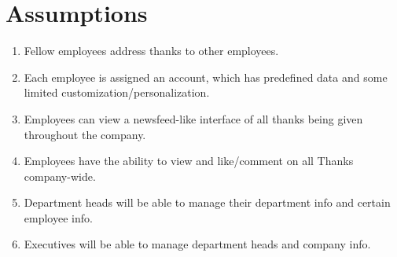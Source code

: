 \documentclass[11pt]{report}
\begin{document}
\section{Assumptions}
\begin{enumerate}
\item Fellow employees address thanks to other employees.
\item Each employee is assigned an account, which has predefined data and some limited customization/personalization.
\item Employees can view a newsfeed-like interface of all thanks being given throughout the company.
\item Employees have the ability to view and like/comment on all Thanks company-wide.
\item Department heads will be able to manage their department info and certain employee info.
\item Executives will be able to manage department heads and company info.
\end{enumerate}
\clearpage
\end{document}
